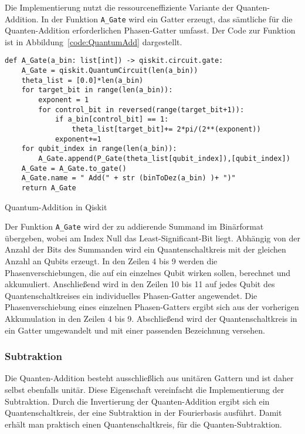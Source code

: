 Die Implementierung nutzt die ressourceneffiziente Variante der Quanten-Addition.
In der Funktion \texttt{A_Gate} wird ein Gatter erzeugt, 
das sämtliche für die Quanten-Addition erforderlichen Phasen-Gatter umfasst.
Der Code zur Funktion ist in Abbildung~\ref{code:QuantumAdd} dargestellt.
\begin{listing}[H]
\begin{verbatim}    
def A_Gate(a_bin: list[int]) -> qiskit.circuit.gate:
    A_Gate = qiskit.QuantumCircuit(len(a_bin))
    theta_list = [0.0]*len(a_bin)
    for target_bit in range(len(a_bin)):
        exponent = 1
        for control_bit in reversed(range(target_bit+1)):
            if a_bin[control_bit] == 1:
                theta_list[target_bit]+= 2*pi/(2**(exponent))
            exponent+=1
    for qubit_index in range(len(a_bin)):
        A_Gate.append(P_Gate(theta_list[qubit_index]),[qubit_index])
    A_Gate = A_Gate.to_gate()
    A_Gate.name = " Add(" + str (binToDez(a_bin) )+ ")"
    return A_Gate 
  \end{verbatim}
  \caption{Quantum-Addition in Qiskit}
  \label{code:QuantumAdd}
\end{listing}
Der Funktion \texttt{A_Gate} wird der zu addierende Summand im Binärformat übergeben, 
wobei am Index Null das Least-Significant-Bit liegt.
Abhängig von der Anzahl der Bits des Summanden wird ein Quantenschaltkreis mit der gleichen Anzahl an Qubits erzeugt. 
In den Zeilen 4 bis 9 werden die Phasenverschiebungen, die auf ein einzelnes Qubit wirken sollen, berechnet und akkumuliert.
Anschließend wird in den Zeilen 10 bis 11 auf jedes Qubit des Quantenschaltkreises ein individuelles Phasen-Gatter angewendet.
Die Phasenverschiebung eines einzelnen Phasen-Gatters ergibt sich aus der vorherigen Akkumulation in den Zeilen 4 bis 9.
Abschließend wird der Quantenschaltkreis in ein Gatter umgewandelt und mit einer passenden Bezeichnung versehen.

\subsubsection{Subtraktion}
Die Quanten-Addition besteht ausschließlich aus unitären Gattern und ist daher selbst ebenfalls unitär.
Diese Eigenschaft vereinfacht die Implementierung der Subtraktion. 
Durch die Invertierung der Quanten-Addition ergibt sich ein Quantenschaltkreis, 
der eine Subtraktion in der Fourierbasis ausführt. 
Damit erhält man praktisch einen Quantenschaltkreis, für die Quanten-Subtraktion.

